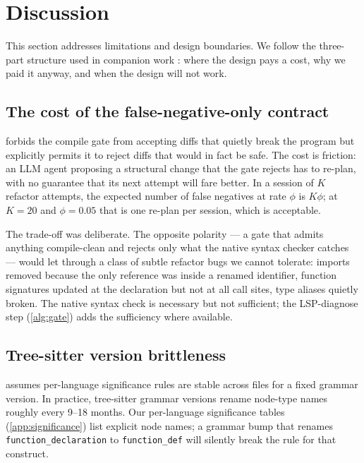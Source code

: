 \section{Discussion}
\label{sec:discussion}

This section addresses limitations and design boundaries. We follow
the three-part structure used in companion work
\cite{blackrim_moa_paper}: where the design pays a cost, why we paid
it anyway, and when the design will not work.

\subsection{The cost of the false-negative-only contract}
\label{sec:discussion:falsenegative}

 forbids the compile gate from accepting
diffs that quietly break the program but explicitly permits it to
reject diffs that would in fact be safe. The cost is friction: an
LLM agent proposing a structural change that the gate rejects has to
re-plan, with no guarantee that its next attempt will fare better.
In a session of $K$ refactor attempts, the expected number of false
negatives at rate $\phi$ is $K \phi$; at $K = 20$ and $\phi = 0.05$
that is one re-plan per session, which is acceptable.

The trade-off was deliberate. The opposite polarity --- a gate that
admits anything compile-clean and rejects only what the native
syntax checker catches --- would let through a class of subtle
refactor bugs we cannot tolerate: imports removed because the only
reference was inside a renamed identifier, function signatures
updated at the declaration but not at all call sites, type aliases
quietly broken. The native syntax check is necessary but not
sufficient; the LSP-diagnose step (\cref{alg:gate}) adds the
sufficiency where available.

\subsection{Tree-sitter version brittleness}
\label{sec:discussion:treesitter}

 assumes per-language significance rules are
stable across files for a fixed grammar version. In practice,
tree-sitter grammar versions rename node-type names roughly every
9--18 months. Our per-language significance tables (\cref{app:significance})
list explicit node names; a grammar bump that renames
\texttt{function\_declaration} to \texttt{function\_def} will silently
break the rule for that construct.


